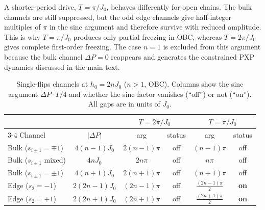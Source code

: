 \documentclass[aps,prb,reprint,twocolumn,amsmath,amssymb,citeautoscript]{revtex4-2}
\begin{document}
A shorter-period drive, $T=\pi/J_0$, behaves differently for open
chains. The bulk channels are still suppressed, but the odd edge
channels give half-integer multiples of $\pi$ in the sinc argument and
therefore survive with reduced amplitude. This is why $T=\pi/J_0$
produces only partial freezing in OBC, whereas $T=2\pi/J_0$ gives
complete first-order freezing. The case $n=1$ is excluded from this
argument because the bulk channel $\Delta P=0$ reappears and generates
the constrained PXP dynamics discussed in the main text.
\begin{table}[t]
\caption{Single-flips channels at $h_0=2nJ_0$ ($n>1$, OBC).
Columns show the sinc argument $\Delta P\cdot T/4$ and whether the
sinc factor vanishes (``off'') or not (``on'').
All gaps are in units of $J_0$.}
\label{tab:app:frz_channels}
\begin{ruledtabular}
\begin{tabular}{lccccc}
& & \multicolumn{2}{c}{$T=2\pi/J_0$}
& \multicolumn{2}{c}{$T=\pi/J_0$}\\
\cline{3-4}\cline{5-6}
Channel & $|\Delta P|$
& arg & status
& arg & status \\
\hline
Bulk ($s_{i\pm 1}=\mp 1$)
& $4(n{-}1)J_0$
& $2(n{-}1)\pi$
& off
& $(n{-}1)\pi$
& off \\[3pt]
Bulk ($s_{i\pm 1}$ mixed)
& $4nJ_0$
& $2n\pi$
& off
& $n\pi$
& off \\[3pt]
Bulk ($s_{i\pm 1}=\pm 1$)
& $4(n{+}1)J_0$
& $2(n{+}1)\pi$
& off
& $(n{+}1)\pi$
& off \\[3pt]
Edge ($s_2=-1$)
& $2(2n{-}1)J_0$
& $(2n{-}1)\pi$
& off
& $\frac{(2n{-}1)\pi}{2}$
& \textbf{on} \\[3pt]
Edge ($s_2=+1$)
& $2(2n{+}1)J_0$
& $(2n{+}1)\pi$
& off
& $\frac{(2n{+}1)\pi}{2}$
& \textbf{on} \\
\end{tabular}
\end{ruledtabular}
\end{table}

\pagebreak


\end{document}
